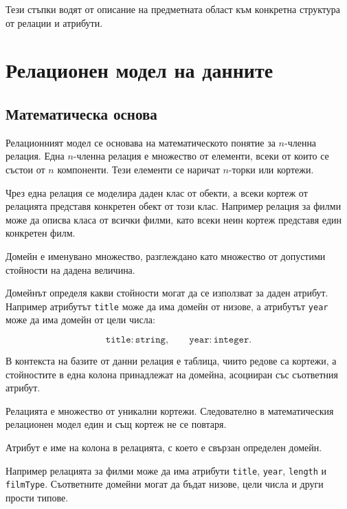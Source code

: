 Тези стъпки водят от описание на предметната област към конкретна структура от релации и атрибути.

\section{Релационен модел на данните}\label{s:23.2}

\subsection{Математическа основа}\label{s:23.2.1}

\begin{defn}
Релационният модел се основава на математическото понятие за $n$-членна релация. Една $n$-членна релация е множество от елементи, всеки от които се състои от $n$ компоненти. Тези елементи се наричат $n$-торки или кортежи.
\end{defn}

Чрез една релация се моделира даден клас от обекти, а всеки кортеж от релацията представя конкретен обект от този клас. Например релация за филми може да описва класа от всички филми, като всеки неин кортеж представя един конкретен филм.

\begin{defn}
Домейн е именувано множество, разглеждано като множество от допустими стойности на дадена величина.
\end{defn}

Домейнът определя какви стойности могат да се използват за даден атрибут. Например атрибутът \texttt{title} може да има домейн от низове, а атрибутът \texttt{year} може да има домейн от цели числа:

\[
\texttt{title}:\texttt{string}, \qquad
\texttt{year}:\texttt{integer}.
\]

\begin{defn}
В контекста на базите от данни релация е таблица, чиито редове са кортежи, а стойностите в една колона принадлежат на домейна, асоцииран със съответния атрибут.
\end{defn}

Релацията е множество от уникални кортежи. Следователно в математическия релационен модел един и същ кортеж не се повтаря.

\begin{defn}
Атрибут е име на колона в релацията, с което е свързан определен домейн.
\end{defn}

Например релацията за филми може да има атрибути \texttt{title}, \texttt{year}, \texttt{length} и \texttt{filmType}. Съответните домейни могат да бъдат низове, цели числа и други прости типове.

